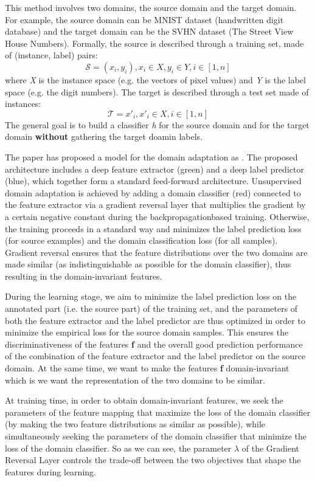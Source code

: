 This method involves two domains, the source domain and the target domain.  For example, the source domain can be MNIST dataset (handwritten digit database) and the target domain can be the SVHN dataset (The Street View House Numbers). Formally, the source is described through a training set, made of (instance, label) pairs:
\[ \mathcal{ S} = {(x_{i},y_{i}), x_{i} \in X, y_{i} \in Y, i \in [1,n]}  \]
where \textit{X} is the instance space (e.g. the vectors of pixel values) and \textit{Y} is the label space (e.g. the digit numbers). The target is described through a test set made of instances:
\[ \mathcal{T} = x'_{i}, x'_{i} \in X, i \in [1,n] \]
The general goal is to build a classifier \textit{h} for the source domain and for the target domain \textbf{without} gathering the target doamin labels.

The paper has proposed a model for the domain adaptation as . The proposed architecture includes a deep feature extractor (green) and a deep label predictor (blue), which together form a standard feed-forward architecture. Unsupervised domain adaptation is achieved by adding a domain classifier (red) connected to the feature extractor via a gradient reversal layer that multiplies the gradient by a certain negative constant during the backpropagationbased training. Otherwise, the training proceeds in a standard way and minimizes the label prediction loss (for source examples) and the domain classification loss (for all samples). Gradient reversal ensures that the feature distributions over the two domains are made similar (as indistinguishable as possible for the domain classifier), thus resulting in the domain-invariant features.

During the learning stage, we aim to minimize the label prediction loss on the annotated part (i.e. the source part) of the training set, and the parameters of both the feature extractor and the label predictor are thus optimized in order to minimize the empirical loss for the source domain samples. This ensures the discriminativeness of the features \textbf{f} and the overall good prediction performance of the combination of the feature extractor and the label predictor on the source domain. At the same time, we want to make the features \textbf{f} domain-invariant which is we want the representation of the two domains to be similar.

At training time, in order to obtain domain-invariant features, we seek the parameters of the feature mapping that maximize the loss of the domain classifier (by making the two feature distributions as similar as possible), while simultaneously seeking the parameters of the domain classifier that minimize the loss of the domain classifier. So as we can see, the parameter $\lambda$ of the Gradient Reversal Layer controls the trade-off between the two objectives that shape the features during learning.

